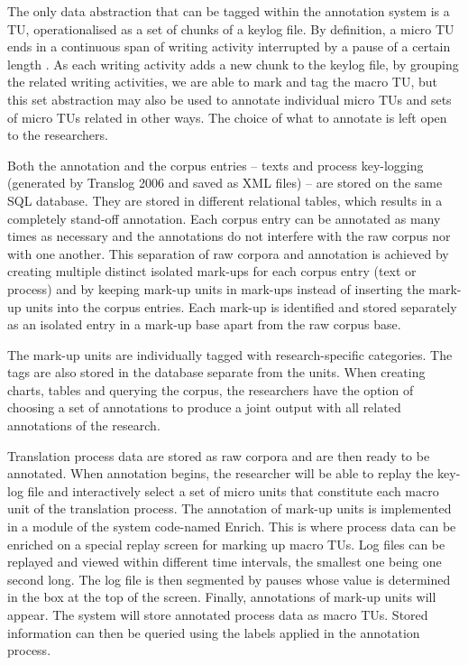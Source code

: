 \documentclass[output=paper]{LSP/langsci}
\begin{document}
The only data abstraction that can be tagged within the annotation system is a TU, operationalised as a set of chunks of a keylog file. By definition, a micro TU ends in a continuous span of writing activity interrupted by a pause of a certain length \citep{Alves2000}. As each writing activity adds a new chunk to the keylog file, by grouping the related writing activities, we are able to mark and tag the macro TU, but this set abstraction may also be used to annotate individual micro TUs and sets of micro TUs related in other ways. The choice of what to annotate is left open to the researchers.

Both the annotation and the corpus entries -- texts and process key-logging (generated by Translog 2006 and saved as XML files) -- are stored on the same SQL database. They are stored in different relational tables, which results in a completely stand-off annotation. Each corpus entry can be annotated as many times as necessary and the annotations do not interfere with the raw corpus nor with one another. This separation of raw corpora and annotation is achieved by creating multiple distinct isolated mark-ups for each corpus entry (text or process) and by keeping mark-up units in mark-ups instead of inserting the mark-up units into the corpus entries. Each mark-up is identified and stored separately as an isolated entry in a mark-up base apart from the raw corpus base.

The mark-up units are individually tagged with research-specific categories. The tags are also stored in the database separate from the units. When creating charts, tables and querying the corpus, the researchers have the option of choosing a set of annotations to produce a joint output with all related annotations of the research.

Translation process data are stored as raw corpora and are then ready to be annotated. When annotation begins, the researcher will be able to replay the key-log file and interactively select a set of micro units that constitute each macro unit of the translation process. The annotation of mark-up units is implemented in a module of the system code-named Enrich. This is where process data can be enriched on a special replay screen for marking up macro TUs. Log files can be replayed and viewed within different time intervals, the smallest one being one second long. The log file is then segmented by pauses whose value is determined in the box at the top of the screen. Finally, annotations of mark-up units will appear. The system will store annotated process data as macro TUs. Stored information can then be queried using the labels applied in the annotation process. 
\end{document}
